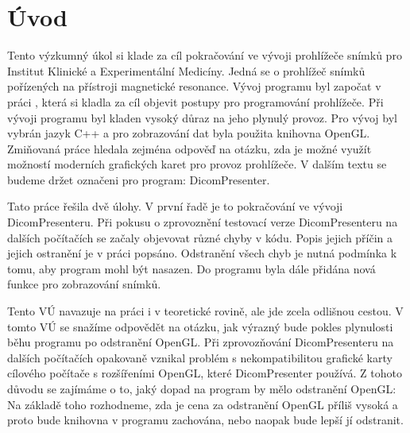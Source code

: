 \chapter*{Úvod}
\vspace{-10mm}
Tento výzkumný úkol si klade za cíl pokračování ve vývoji prohlížeče snímků pro Institut Klinické a Experimentální Medicíny. Jedná se o prohlížeč snímků pořízených na přístroji magnetické resonance. Vývoj programu byl započat v práci \cite{neskudla}, která si kladla za cíl objevit postupy pro programování prohlížeče. Při vývoji programu byl kladen vysoký důraz na jeho plynulý provoz. Pro vývoj byl vybrán jazyk C++ a pro zobrazování dat byla použita knihovna OpenGL. Zmiňovaná práce hledala zejména odpověď na otázku, zda je možné využít možností moderních grafických karet pro provoz prohlížeče. V dalším textu se budeme držet označeni pro program: DicomPresenter.

Tato práce řešila dvě úlohy. V první řadě je to pokračování ve vývoji DicomPresenteru. Při pokusu o zprovoznění testovací verze DicomPresenteru na dalších počítačích se začaly objevovat různé chyby v kódu. Popis jejich příčin a jejich ostranění je v práci popsáno. Odstranění všech chyb je nutná podmínka k tomu, aby program mohl být nasazen. Do programu byla dále přidána nová funkce pro zobrazování snímků.

Tento VÚ navazuje na práci \cite{neskudla} i v teoretické rovině, ale jde zcela odlišnou cestou. V tomto VÚ se snažíme odpovědět na otázku, jak výrazný bude pokles plynulosti běhu programu po odstranění OpenGL. Při zprovozňování DicomPresenteru na dalších počítačích opakovaně vznikal problém s nekompatibilitou grafické karty cílového počítače s rozšířeními OpenGL, které DicomPresenter používá. Z tohoto důvodu se zajímáme o to, jaký dopad na program by mělo odstranění OpenGL: Na základě toho rozhodneme, zda je cena za odstranění OpenGL příliš vysoká a proto bude knihovna v programu zachována, nebo naopak bude lepší jí odstranit.


